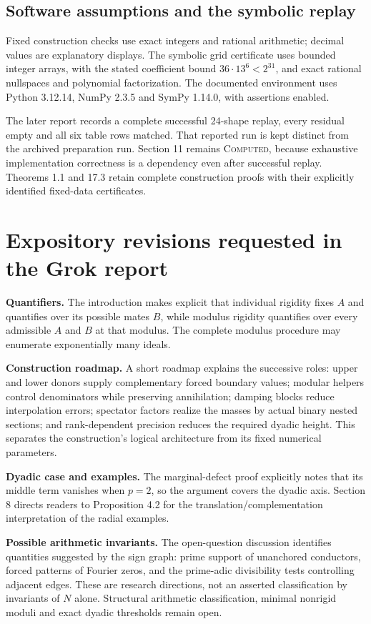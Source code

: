 \documentclass[11pt]{article}
\begin{document}
\subsection*{Software assumptions and the symbolic replay}
Fixed construction checks use exact integers and rational arithmetic;
decimal values are explanatory displays. The symbolic grid certificate
uses bounded integer arrays, with the stated coefficient bound
\(36\cdot13^6<2^{31}\), and exact rational nullspaces and polynomial
factorization. The documented environment uses Python 3.12.14,
NumPy 2.3.5 and SymPy 1.14.0, with assertions enabled.

The later report records a complete successful 24-shape replay, every
residual empty and all six table rows matched. That reported run is kept
distinct from the archived preparation run. Section 11 remains
\textsc{Computed}, because exhaustive implementation correctness is a
dependency even after successful replay. Theorems 1.1 and 17.3 retain
complete construction proofs with their explicitly identified fixed-data
certificates.

\section{Expository revisions requested in the Grok report}
\textbf{Quantifiers.}
The introduction makes explicit that individual rigidity fixes \(A\)
and quantifies over its possible mates \(B\), while modulus rigidity
quantifies over every admissible \(A\) and \(B\) at that modulus.
The complete modulus procedure may enumerate exponentially many ideals.

\textbf{Construction roadmap.}
A short roadmap explains the successive roles: upper and lower donors
supply complementary forced boundary values; modular helpers control
denominators while preserving annihilation; damping blocks reduce
interpolation errors; spectator factors realize the masses by actual
binary nested sections; and rank-dependent precision reduces the
required dyadic height. This separates the construction's logical
architecture from its fixed numerical parameters.

\textbf{Dyadic case and examples.}
The marginal-defect proof explicitly notes that its middle term vanishes
when \(p=2\), so the argument covers the dyadic axis. Section 8 directs
readers to Proposition 4.2 for the translation/complementation
interpretation of the radial examples.

\textbf{Possible arithmetic invariants.}
The open-question discussion identifies quantities suggested by the
sign graph: prime support of unanchored conductors, forced patterns of
Fourier zeros, and the prime-adic divisibility tests controlling adjacent
edges. These are research directions, not an asserted classification
by invariants of \(N\) alone. Structural arithmetic classification,
minimal nonrigid moduli and exact dyadic thresholds remain open.
\end{document}
